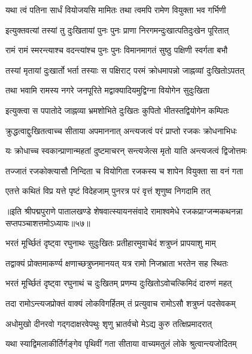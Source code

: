 \twolineshloka
{यथा त्वं पतिना सार्धं वियोजयसि मामितः}
{तथा त्वमपि रामेण वियुक्ता भव गर्भिणी}%

\twolineshloka
{इत्युक्तवत्यां तस्यां तु दुःखितायां पुनः पुनः}
{प्राणा निरगमन्दुःखात्पतिदुःखेन पूरितात्}%

\twolineshloka
{रामं रामं स्मरन्त्याश्च वदन्त्यांश्च पुनः पुनः}
{विमानमागतं सुष्ठु पक्षिणी स्वर्गता बभौ}%

\twolineshloka
{तस्यां मृतायां दुःखार्तो भर्ता तस्याः स पक्षिराट्}
{परमं क्रोधमापन्नो जाह्नव्यां दुःखितोऽपतत्}%

\twolineshloka
{तथा भवामि रामस्य नगरे जनपूरिते}
{मद्वाक्यादियमुद्विग्ना वियोगेन सुदुःखिता}%

\twolineshloka
{इत्युक्त्वा स पपातोदे जाह्नव्या भ्रमशोभिते}
{दुःखितः कुपितो भीतस्तद्वियोगेन कम्पितः}%

\twolineshloka
{क्रुद्धत्वाद्दुःखितत्वाच्च सीताया अपमाननात्}
{अन्त्यजत्वं परं प्राप्तो रजकः क्रोधनाभिधः}%

\twolineshloka
{यः क्रोधाच्च स्वकान्प्राणान्महतां दुष्टमाचरन्}
{सन्त्यजेत्स मृतो याति अन्त्यजत्वं द्विजोत्तमः}%

\twolineshloka
{तज्जातं रजकोक्त्यासौ निन्दिता च वियोगिता}
{रजकस्य च शापेन वियुक्ता सा वनं गता}%

\twolineshloka
{एतत्ते कथितं विप्र यत्ते पृष्टं विदेहजाम्}
{पुनरत्र परं वृत्तं शृणुष्व निगदामि तत्}%


{॥इति श्रीपद्मपुराणे पातालखण्डे शेषवात्स्यायनसंवादे रामाश्वमेधे रजकप्राग्जन्मकथनन्ना सप्तपञ्चाशत्तमोऽध्यायः॥५७॥}

\resetShloka


\twolineshloka
{भरतं मूर्च्छितं दृष्ट्वा रघुनाथः सुदुःखितः}
{प्रतीहारमुवाचेदं शत्रुघ्नं प्रापयाशु माम्}%

\twolineshloka
{तद्वाक्यं प्रोक्तमाकर्ण्य क्षणाच्छत्रुघ्नमानयत्}
{यत्र रामो निजभ्राता भरतेन सह स्थितः}%

\twolineshloka
{भरतं मूर्च्छितं दृष्ट्वा रघुनाथं च दुःखितम्}
{प्रणम्य दुःखितोऽवोचत्किमिदं दारुणं महत्}%

\twolineshloka
{तदा रामोऽन्त्यजप्रोक्तं वाक्यं लोकविगर्हितम्}
{तं प्रत्युवाच रामोऽसौ शत्रुघ्नं पदसेवकम्}%

\twolineshloka
{अधोमुखो दीनरवो गद्गदाक्षरवेपथुः}
{शृणु भ्रातर्वचो मेऽद्य कुरु तत्क्षिप्रमादरात्}%

\twolineshloka
{यथा स्याद्विमलाकीर्तिर्गङ्गेव पृथिवीं गता}
{सीताया वाच्यमतुलं लोके श्रुत्वान्त्यजोदितम्}%

